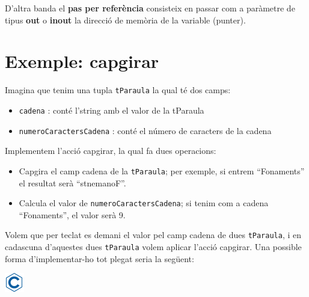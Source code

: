 \documentclass[]{book}
\providecommand{\tightlist}{%
  \setlength{\itemsep}{0pt}\setlength{\parskip}{0pt}}
\begin{document}
D'altra banda el \textbf{pas per referència} consisteix en passar com a
paràmetre de tipus \textbf{out} o \textbf{inout} la direcció de memòria
de la variable (punter).

\section{Exemple: capgirar}\label{exemple-capgirar}

Imagina que tenim una tupla \texttt{tParaula} la qual té dos camps:

\begin{itemize}
\tightlist
\item
  \texttt{cadena} : conté l'string amb el valor de la tParaula
\item
  \texttt{numeroCaractersCadena} : conté el número de caracters de la
  cadena
\end{itemize}

Implementem l'acció capgirar, la qual fa dues operacions:

\begin{itemize}
\tightlist
\item
  Capgira el camp cadena de la \texttt{tParaula}; per exemple, si entrem
  ``Fonaments'' el resultat serà ``stnemanoF''.
\item
  Calcula el valor de \texttt{numeroCaractersCadena}; si tenim com a
  cadena ``Fonaments'', el valor serà 9.
\end{itemize}

Volem que per teclat es demani el valor pel camp cadena de dues
\texttt{tParaula}, i en cadascuna d'aquestes dues \texttt{tParaula}
volem aplicar l'acció capgirar. Una possible forma d'implementar-ho tot
plegat seria la següent:

\includegraphics{./img/c.png}
\end{document}
